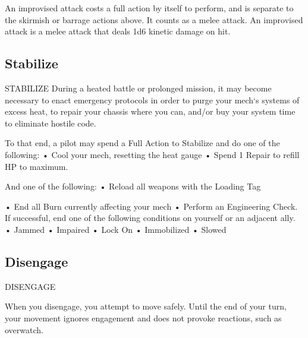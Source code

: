 An improvised attack costs a full action by itself to perform, and is separate to the skirmish or  
barrage actions above. It counts as a melee attack. An improvised attack is a melee attack that  
deals 1d6 kinetic damage on hit.  
\subsection{Stabilize}
                                              STABILIZE  
During a heated battle or prolonged mission, it may become necessary to enact emergency  
protocols in order to purge your mech‘s systems of excess heat, to repair your chassis where you  
can, and/or buy your system time to eliminate hostile code.  

To that end, a pilot may spend a Full Action to Stabilize and do one of the following:  
•  Cool your mech, resetting the heat gauge  
•  Spend 1 Repair to refill HP to maximum.  

And one of the following:  
•  Reload all weapons with the Loading Tag  

                                                                                                           


•  End all Burn currently affecting your mech  
•  Perform an Engineering Check. If successful, end one of the following conditions on yourself  
  or an adjacent ally.  
             •  Jammed  
             •  Impaired  
             •  Lock On  
             •  Immobilized  
             •  Slowed  
\subsection{Disengage}
                                            DISENGAGE  

When you disengage, you attempt to move safely. Until the end of your turn, your movement  
ignores engagement and does not provoke reactions, such as overwatch.
 

